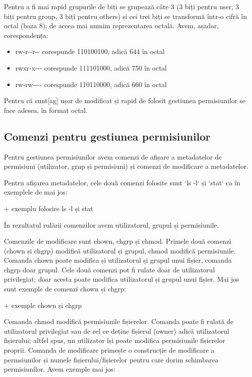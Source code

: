 Pentru a fi mai rapid grupurile de biți se grupează câte 3 (3 biți pentru user,
3 biți pentru group, 3 bițî pentru others) și cei trei biți se transformă într-o
cifră în octal (baza 8); de aceea mai numim reprezentarea octală. Avem, așadar,
corespondența:

\begin{itemize}
	\item rw-r-{}-r-{}- corespunde 110100100, adică 644 în octal
	\item rwxr-x-{}-{}- corespunde 111101000, adică 750 în octal
	\item rw-rw-{}-{}-{}- corespunde 110110000, adică 660 în octal
\end{itemize}

Pentru că sunt[ag] ușor de modificat și rapid de folosit gestiunea permisiunilor
se face adesea, în format octal.

\subsection{Comenzi pentru gestiunea permisiunilor}
\label{sec:users-fs-perms-cmd}

Pentru gestiunea permisiunilor avem comenzi de afișare a metadatelor de
permisiuni (utilizator, grup și permisiuni) și comenzi de modificare a
metadatelor.

Pentru afișarea metadatelor, cele două comenzi folosite sunt `ls -l` și `stat`
ca în exemplele de mai jos:

+ exemplu folosire ls -l și stat

În rezultatul rulării comenzilor avem utilizatorul, grupul și permisiunile.

Comenzile de modificare sunt chown, chgrp și chmod. Primele două comenzi (chown
și chgrp) modifică utilizatorul și grupul, chmod modifică permisiunile. Comanda
chown poate modifica și utilizatorul și grupul unui fișier, comanda chgrp doar
grupul. Cele două comenzi pot fi rulate doar de utilizatorul privilegiat; doar
acesta poate modifica utilizatorul și grupul unui fișier. Mai jos sunt exemple
de comenzi chown și chgrp:

+ exemple chown și chgrp

Comanda chmod modifică permisiunile fișierelor. Comanda poate fi rulată de
utilizatorul privilegiat sau de cel ce deține fișierul (owner) adică
utilizatorul fișierului; altfel spus, un utilizator își poate modifica
permisiunile fișierelor proprii. Comanda de modificare primește o construcție de
modificare a permsiunilor și numele fișierului/fișierelor pentru care dorim
schimbarea permisiunilor. Avem exemple mai jos:

